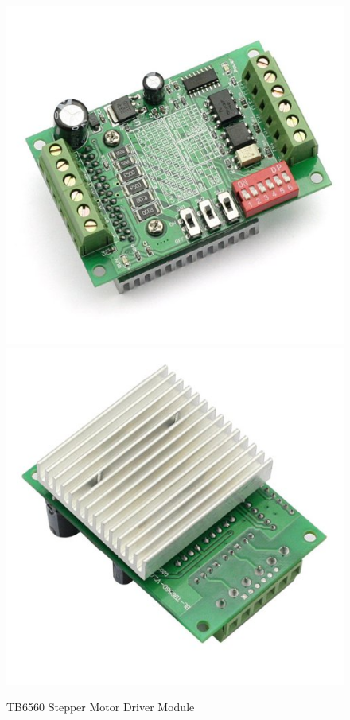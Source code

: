 \documentclass[11pt,a4paper]{article}
\begin{document}
\begin{figure}[h!]
	\centering
	\includegraphics[scale=0.3]{img/TB6560-front.jpg}
	\includegraphics[scale=0.3]{img/TB6560-back.jpg}
	\caption{TB6560 Stepper Motor Driver Module}
	\label{fig:TB6560 Stepper Motor Driver Module}
\end{figure}
\end{document}
